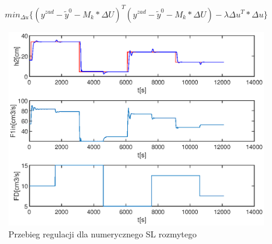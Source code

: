 	\begin{equation}
		min_{\Delta u}\{(y^{zad}-\tilde{y}^0-M_k*\Delta U)^T(y^{zad}-\tilde{y}^0-M_k*\Delta U)-\lambda \Delta u^T*\Delta u\}
		\label{eq:sl}
	\end{equation}
	
	\begin{figure}[h!]
		\includegraphics[width=0.9\linewidth]{plots/z3_fdmc_sl.eps}
		\caption{Przebieg regulacji dla numerycznego SL rozmytego}
		\label{rys:sl}
	\end{figure}